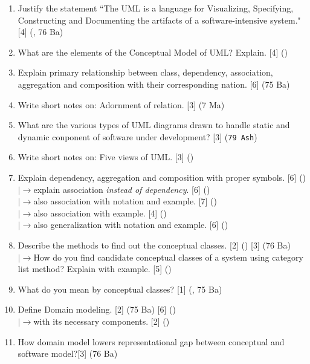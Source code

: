\documentclass[12pt]{article}
\newcommand{\lb}{\\$\left|\rightarrow\right.$}
\begin{document}
\begin{enumerate}
      \item Justify the statement ``The UML is a language for Visualizing, Specifying, Constructing and Documenting the artifacts of a software-intensive system." \hfill [4] (, 76 Ba)

      \item What are the elements of the Conceptual Model of UML? Explain. \hfill [4] ()

     
      \item Explain primary relationship between class, dependency, association, aggregation and composition with their corresponding nation. \hfill [6] (75 Ba)

      \item Write short notes on: Adornment of relation. \hfill [3] (7 Ma)

      \item What are the various types of UML diagrams drawn to handle static and dynamic conponent of software under development? \hfill [3] (\texttt{79 Ash})

      \item Write short notes on: Five views of UML. \hfill [3] ()

      \item Explain dependency, aggregation and composition with proper symbols. \hfill [6] ()
        \lb explain association \textit{instead of dependency}. \hfill [6] ()
        \lb also association with notation and example. \hfill [7] ()
        \lb also association with example. \hfill [4] ()
        \lb also generalization with notation and example. \hfill [6] ()

      \item Describe the methods to find out the conceptual classes. \hfill [2] () [3] (76 Ba)
        \lb How do you find candidate conceptual classes of a system using category list method? Explain with example. \hfill [5] ()

      \item What do you mean by conceptual classes? \hfill [1] (, 75 Ba)

      \item Define Domain modeling. \hfill [2] (75 Ba) [6] ()
        \lb with its necessary components. \hfill [2] ()

      \item How domain model lowers representational gap between conceptual and software model?\hfill [3] (76 Ba)


\end{enumerate}
\end{document}
